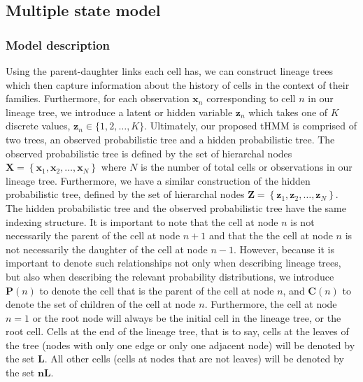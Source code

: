 \documentclass[11pt]{article}
\begin{document}
\hypertarget{multiple-state-model}{%
\subsection{Multiple state model}\label{multiple-state-model}}

\hypertarget{model-description}{%
\subsubsection{Model description}\label{model-description}}

Using the parent-daughter links each cell has, we can construct lineage
trees which then capture information about the history of cells in the
context of their families. Furthermore, for each observation
\(\bm{x}_{n}\) corresponding to cell \(n\) in our lineage tree, we
introduce a latent or hidden variable \(\bm{z}_{n}\) which takes one of
\(K\) discrete values, \(\bm{z}_{n}\in\{1,2,\ldots,K\}\). Ultimately,
our proposed tHMM is comprised of two trees, an observed probabilistic
tree and a hidden probabilistic tree. The observed probabilistic tree is
defined by the set of hierarchal nodes
\(\bm{X}=\left\lbrace\bm{x}_{1},\bm{x}_{2},\ldots,\bm{x}_{N}\right\rbrace\)
where \(N\) is the number of total cells or observations in our lineage
tree. Furthermore, we have a similar construction of the hidden
probabilistic tree, defined by the set of hierarchal nodes
\(\bm{Z}=\left\lbrace\bm{z}_{1},\bm{z}_{2},\ldots,\bm{z}_{N}\right\rbrace\).
The hidden probabilistic tree and the observed probabilistic tree have
the same indexing structure. It is important to note that the cell at
node \(n\) is not necessarily the parent of the cell at node \(n+1\) and
that the the cell at node \(n\) is not necessarily the daughter of the
cell at node \(n-1\). However, because it is important to denote such
relationships not only when describing lineage trees, but also when
describing the relevant probability distributions, we introduce
\(\bm{P}(n)\) to denote the cell that is the parent of the cell at node
\(n\), and \(\bm{C}(n)\) to denote the set of children of the cell at
node \(n\). Furthermore, the cell at node \(n=1\) or the root node will
always be the initial cell in the lineage tree, or the root cell. Cells
at the end of the lineage tree, that is to say, cells at the leaves of
the tree (nodes with only one edge or only one adjacent node) will be
denoted by the set \(\bm{L}\). All other cells (cells at nodes that are
not leaves) will be denoted by the set \(\bm{nL}\).
\end{document}
